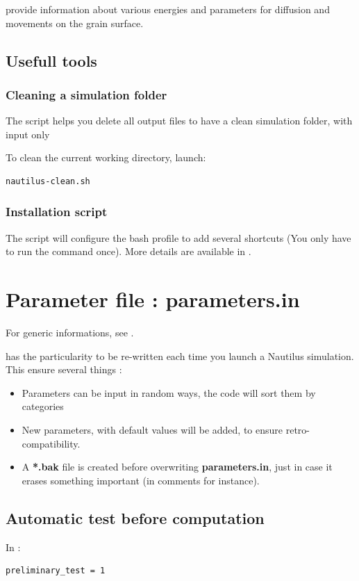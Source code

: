 \documentclass[english,a4paper,twoside]{article}
\begin{document}
 provide information about various energies and parameters for diffusion and movements on the grain surface.

\subsection{Usefull tools}
\subsubsection{Cleaning a simulation folder}
The script  helps you delete all output files to have a clean simulation folder, with input only

To clean the current working directory, launch:
\begin{verbatim}
nautilus-clean.sh
\end{verbatim}

\subsubsection{Installation script}
The script  will configure the bash profile to add several shortcuts (You only have to run the command once). More details are available in .

\section{Parameter file : parameters.in}\label{sec:parameters_in}
For generic informations, see .

 has the particularity to be re-written each time you launch a Nautilus simulation. This ensure several things :
\begin{itemize}
\item Parameters can be input in random ways, the code will sort them by categories
\item New parameters, with default values will be added, to ensure retro-compatibility.
\item A \textbf{*.bak} file is created before overwriting \textbf{parameters.in}, just in case it erases something important (in comments for instance).
\end{itemize}

\subsection{Automatic test before computation}
In : 
\begin{verbatim}
preliminary_test = 1
\end{verbatim}
\end{document}
